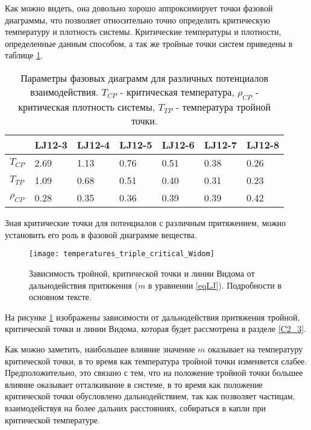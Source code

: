Как можно видеть, она довольно хорошо аппроксимирует точки фазовой диаграммы, что позволяет относительно точно определить критическую температуру и плотность системы.
Критические температуры и плотности, определенные данным способом, а так же тройные точки систем приведены в таблице \ref{tablSystemConst}.

\begin{table}[h]
\begin{center}
\begin{tabular}{| l | l | l | l | l | l | l |}
\hline
            & LJ12-3   & LJ12-4   & LJ12-5   & LJ12-6   & LJ12-7   & LJ12-8   \\ \hline
$T_{CP}$    & 2.69     &  1.13    &  0.76    &    0.51  & 0.38     & 0.26     \\ \hline
$T_{TP}$    & 1.09     & 0.68     & 0.51     & 0.40     & 0.31     & 0.23     \\ \hline
$\rho_{CP}$ & 0.28     &  0.35    &  0.36    &  0.39    & 0.39     & 0.42     \\ \hline
\end{tabular}
\end{center}
\caption{Параметры фазовых диаграмм для различных потенциалов взаимодействия. $T_{CP}$ - критическая температура, $\rho_{CP}$ - критическая плотность системы, $T_{TP}$ - температура тройной точки.}
\label{tablSystemConst}
\end{table}

Зная критические точки для потенциалов с различным притяжением, можно установить его роль в фазовой диаграмме вещества.

\begin{figure}[h]
\begin{center}
\texttt{[image: temperatures\_triple\_critical\_Widom]}
\caption{Зависимость тройной, критической точки и линии Видома от дальнодействия притяжения ($m$ в уравнении \ref{eqLJ}). Подробности в основном тексте.}
\label{risTcpTtpWlNoFrac}
\end{center}
\end{figure}

На рисунке \ref{risTcpTtpWlNoFrac} изображены зависимости от дальнодействия притяжения тройной, критической точки и линии Видома, которая будет рассмотрена в разделе \ref{C2_3}.

Как можно заметить, наибольшее влияние значение $m$ оказывает на температуру критической точки, в то время как температура тройной точки изменяется слабее. Предположительно, это связано с тем, что на положение тройной точки большее влияние оказывает отталкивание в системе, в то время как положение критической точки обусловлено дальнодействием, так как позволяет частицам, взаимодействуя на более дальних расстояниях, собираться в капли при критической температуре.

